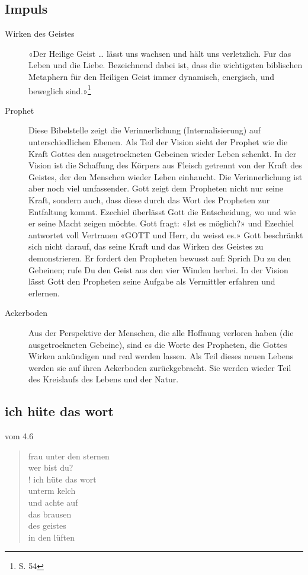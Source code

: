 \subsection{Impuls}
\begin{impuls}
\begin{description}
\item[Wirken des Geistes] «Der Heilige Geist … lässt uns wachsen und hält uns verletzlich. Fur das Leben und die Liebe. Bezeichnend dabei ist, dass die wichtigsten biblischen Metaphern für den Heiligen Geist immer dynamisch, energisch, und beweglich sind.»\footnote{\cite{Tanz} S. 54}
\item[Prophet] Diese Bibelstelle zeigt die Verinnerlichung (Internalisierung) auf unterschiedlichen Ebenen. Als Teil der Vision sieht der Prophet wie die Kraft Gottes den ausgetrockneten Gebeinen wieder Leben schenkt. In der Vision ist die Schaffung des Körpers aus Fleisch getrennt von der Kraft des Geistes, der den Menschen wieder Leben einhaucht. Die Verinnerlichung ist aber noch viel umfassender. Gott zeigt dem Propheten nicht nur seine Kraft, sondern auch, dass diese durch das Wort des Propheten zur Entfaltung kommt. Ezechiel überlässt Gott die Entscheidung, wo und wie er seine Macht zeigen möchte. Gott fragt: «Ist es möglich?» und Ezechiel antwortet voll Vertrauen «GOTT und Herr, du weisst es.» Gott beschränkt sich nicht darauf, das seine Kraft und das Wirken des Geistes zu demonstrieren. Er fordert den Propheten bewusst auf: Sprich Du zu den Gebeinen; rufe Du den Geist aus den vier Winden herbei. In der Vision lässt Gott den Propheten seine Aufgabe als Vermittler erfahren und erlernen.
\item[Ackerboden] Aus der Perspektive der Menschen, die alle Hoffnung verloren haben (die ausgetrockneten Gebeine), sind es die Worte des Propheten, die Gottes Wirken ankündigen und real werden lassen. Als Teil dieses neuen Lebens werden sie auf ihren Ackerboden zurückgebracht. Sie werden wieder Teil des Kreislaufs des Lebens und der Natur.
\end{description}
\end{impuls}

\subsection{ich hüte das wort}
\cite{KHH} vom 4.6
\begin{gedicht}
\begin{verse}
frau unter den sternen\\
wer bist du?\\!
ich hüte das wort\\
unterm kelch\\
und achte auf\\
das brausen\\
des geistes\\
in den lüften
\end{verse}
\end{gedicht}

